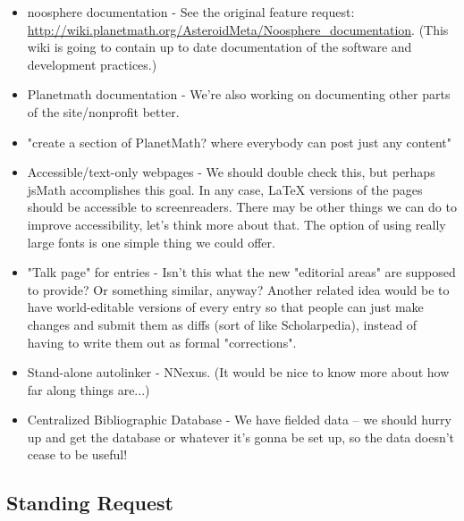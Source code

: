 \begin{itemize}
\item noosphere documentation - See the original feature request: \url{http://wiki.planetmath.org/AsteroidMeta/Noosphere_documentation}. (This wiki is going to contain up to date documentation of the software and development practices.) 

\item Planetmath documentation - We're also working on documenting other parts of the site/nonprofit better. 

\item "create a section of PlanetMath? where everybody can post just any content" 

\item Accessible/text-only webpages - We should double check this, but perhaps jsMath accomplishes this goal. In any case, LaTeX versions of the pages should be accessible to screenreaders. There may be other things we can do to improve accessibility, let's think more about that. The option of using really large fonts is one simple thing we could offer. 

\item "Talk page" for entries - Isn't this what the new "editorial areas" are supposed to provide? Or something similar, anyway? Another related idea would be to have world-editable versions of every entry so that people can just make changes and submit them as diffs (sort of like Scholarpedia), instead of having to write them out as formal "corrections". 

\item Stand-alone autolinker - NNexus. (It would be nice to know more about how far along things are...) 

\item Centralized Bibliographic Database - We have fielded data -- we should hurry up and get the database or whatever it's gonna be set up, so the data doesn't cease to be useful! 
\end{itemize}

\subsection*{Standing Request}

